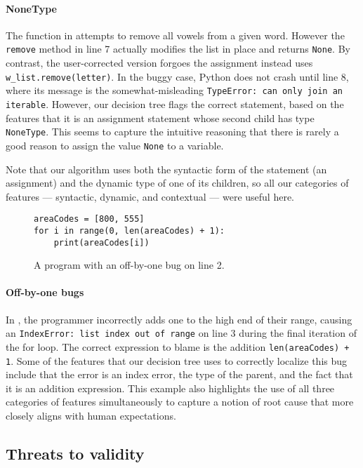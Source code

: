 \documentclass[conference]{IEEEtran}
\newcommand\lt[1]{{\lstinline|#1|}}
\begin{document}
\paragraph{NoneType}
The function in  attempts to remove all vowels from
a given word. However the \lt{remove} method in line 7 actually modifies
the list in place and returns \lt{None}. By contrast, the user-corrected
version forgoes the assignment instead uses \lt{w_list.remove(letter)}. In
the buggy case, Python does not crash until line 8, where its message is
the somewhat-misleading \lt{TypeError: can only join an iterable}. However,
our decision tree flags the correct statement, based on the features
that it is an assignment statement whose second child has type
\lt{NoneType}. This seems to capture the intuitive reasoning that there is
rarely a good reason to assign the value \lt{None} to a variable.

Note that our algorithm uses both the syntactic form of the statement (an
assignment) and the dynamic type of one of its children, so all our
categories of features --- syntactic, dynamic, and contextual --- were
useful here.

\begin{figure}
\begin{lstlisting}
areaCodes = [800, 555]
for i in range(0, len(areaCodes) + 1):
    print(areaCodes[i])
\end{lstlisting}
\caption{A program with an off-by-one bug on line 2.}
\label{fig-win-example-two}
\end{figure}

\paragraph{Off-by-one bugs}
In , the programmer incorrectly adds one to the high
end of their range, causing an \lt{IndexError: list index out of range} on line
3 during the final iteration of the for loop. The correct expression to blame
is the addition \lt{len(areaCodes) + 1}. Some of the features that our
decision tree uses to correctly localize this bug include that the error is an
index error, the type of the parent, and the fact that it is an addition
expression. This example also highlights the use of all three categories of
features simultaneously to capture a notion of root cause that more closely
aligns with human expectations.

\subsection{Threats to validity}
\label{sec-threats}
\end{document}
